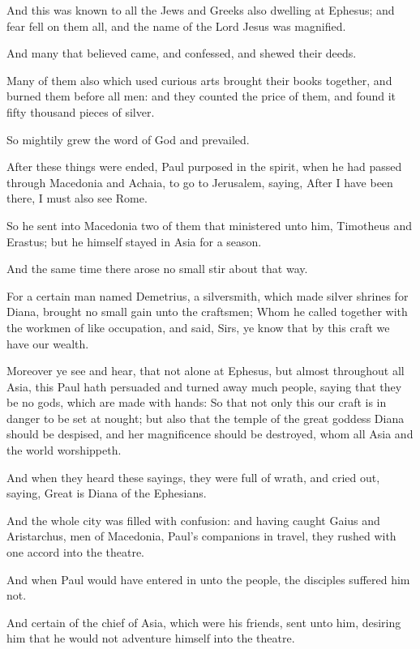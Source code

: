 \Verse And this was known to all the Jews and Greeks also dwelling at Ephesus; and fear fell on them all, and the name of the Lord Jesus was magnified.

\Verse And many that believed came, and confessed, and shewed their deeds.

\Verse Many of them also which used curious arts brought their books together, and burned them before all men: and they counted the price of them, and found it fifty thousand pieces of silver.

\Verse So mightily grew the word of God and prevailed.

\Verse After these things were ended, Paul purposed in the spirit, when he had passed through Macedonia and Achaia, to go to Jerusalem, saying, After I have been there, I must also see Rome.

\Verse So he sent into Macedonia two of them that ministered unto him, Timotheus and Erastus; but he himself stayed in Asia for a season.

\Verse And the same time there arose no small stir about that way.

\Verse For a certain man named Demetrius, a silversmith, which made silver shrines for Diana, brought no small gain unto the craftsmen; \Verse Whom he called together with the workmen of like occupation, and said, Sirs, ye know that by this craft we have our wealth.

\Verse Moreover ye see and hear, that not alone at Ephesus, but almost throughout all Asia, this Paul hath persuaded and turned away much people, saying that they be no gods, which are made with hands: \Verse So that not only this our craft is in danger to be set at nought; but also that the temple of the great goddess Diana should be despised, and her magnificence should be destroyed, whom all Asia and the world worshippeth.

\Verse And when they heard these sayings, they were full of wrath, and cried out, saying, Great is Diana of the Ephesians.

\Verse And the whole city was filled with confusion: and having caught Gaius and Aristarchus, men of Macedonia, Paul's companions in travel, they rushed with one accord into the theatre.

\Verse And when Paul would have entered in unto the people, the disciples suffered him not.

\Verse And certain of the chief of Asia, which were his friends, sent unto him, desiring him that he would not adventure himself into the theatre.

